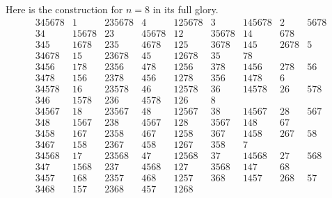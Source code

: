 \documentclass[11pt]{scrartcl}
\begin{document}
\begin{remark*}
  Here is the construction for $n=8$ in its full glory.
\[
 \begin{array}{ccccccccc}
 345678 & 1 & 235678 & 4 & 125678 & 3 & 145678 & 2 & 5678 \\
 34 & 15678 & 23 & 45678 & 12 & 35678 & 14 & 678 & \\
 345 & 1678 & 235 & 4678 & 125 & 3678 & 145 & 2678 & 5 \\
 34678 & 15 & 23678 & 45 & 12678 & 35 & 78 & & \\\hline
 3456 & 178 & 2356 & 478 & 1256 & 378 & 1456 & 278 & 56 \\
 3478 & 156 & 2378 & 456 & 1278 & 356 & 1478 & 6 & \\
 34578 & 16 & 23578 & 46 & 12578 & 36 & 14578 & 26 & 578 \\
 346 & 1578 & 236 & 4578 & 126 & 8 & & & \\ \hline\hline
 34567 & 18 & 23567 & 48 & 12567 & 38 & 14567 & 28 & 567 \\
 348 & 1567 & 238 & 4567 & 128 & 3567 & 148 & 67 & \\
 3458 & 167 & 2358 & 467 & 1258 & 367 & 1458 & 267 & 58 \\
 3467 & 158 & 2367 & 458 & 1267 & 358 & 7 & & \\\hline
 34568 & 17 & 23568 & 47 & 12568 & 37 & 14568 & 27 & 568 \\
 347 & 1568 & 237 & 4568 & 127 & 3568 & 147 & 68 & \\
 3457 & 168 & 2357 & 468 & 1257 & 368 & 1457 & 268 & 57 \\
 3468 & 157 & 2368 & 457 & 1268 & & & & \\
 \end{array}
\]
\end{remark*}
\pagebreak
\end{document}
